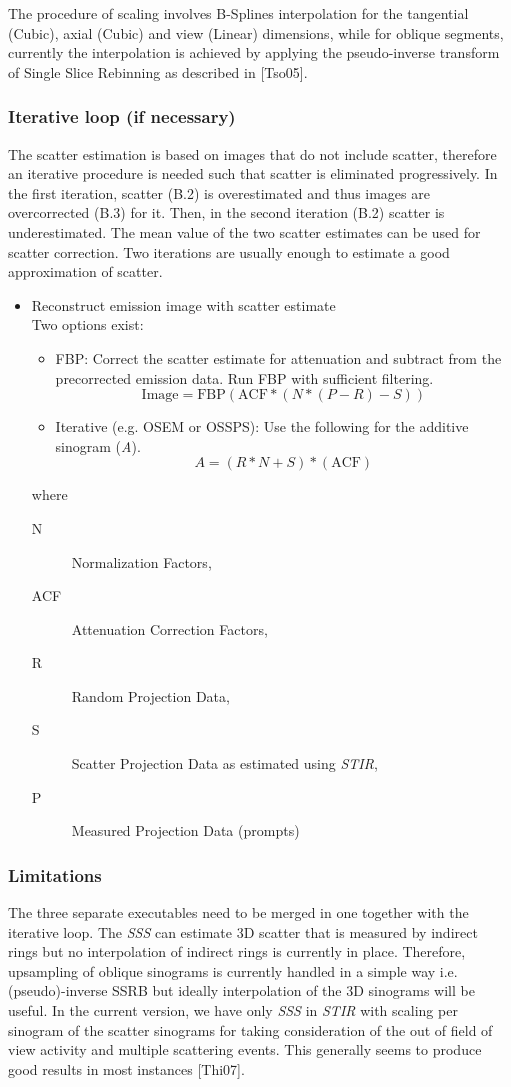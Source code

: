 \documentclass{article}
\begin{document}
{{{The procedure of scaling involves B-Splines interpolation for the tangential (Cubic), axial (Cubic) and
view (Linear) dimensions, while for oblique segments, currently the interpolation is achieved by applying the
pseudo-inverse transform of Single Slice Rebinning as described in [Tso05].

\subsubsection{Iterative loop (if necessary)}
The scatter estimation is based on images that do not include scatter, therefore an iterative procedure
is needed such that scatter is eliminated progressively. In the first iteration, scatter (B.2) is
overestimated and thus images are overcorrected (B.3) for it. Then, in the second iteration (B.2) scatter
is underestimated. The mean value of the two scatter estimates can be used for scatter correction. Two
iterations are usually enough to estimate a good approximation of scatter.

\begin{itemize}
\item Reconstruct emission image with scatter estimate\\
Two options exist:
\begin{itemize}
\item	FBP: Correct the scatter estimate for attenuation and subtract from the precorrected emission data. 
Run FBP with sufficient filtering.
   \[\mathrm{Image} = \mathrm{FBP}\left(\mathrm{ACF}*(N*(P-R)-S)\right) \]
\item Iterative (e.g. OSEM or OSSPS): Use the following for the additive sinogram (\textit{A}).
    \[A=(R*N+S)*(\mathrm{ACF})  \]
\end{itemize}
where
  \begin{description}
   \item[N] Normalization Factors, 
   \item[ACF] Attenuation Correction Factors,
   \item[R] Random Projection Data,
   \item[S] Scatter Projection Data as estimated using  \textit{STIR},
   \item[P] Measured Projection Data (prompts)
  \end{description}
\end{itemize}

\subsubsection{Limitations}
The three separate executables need to be merged in one together with the iterative loop. The
\textit{SSS} can estimate 3D scatter that is measured by indirect rings but no interpolation of indirect
rings is currently in place. Therefore, upsampling of oblique sinograms is currently handled in a simple
way i.e. (pseudo)-inverse SSRB but ideally interpolation of the 3D sinograms will be useful. In the
current version, we have only \textit{SSS} in \textit{STIR} with scaling per sinogram of the scatter
sinograms for taking consideration of the out of field of view activity and multiple scattering
events. This generally seems to produce good results in most instances [Thi07].


}}}
\end{document}
